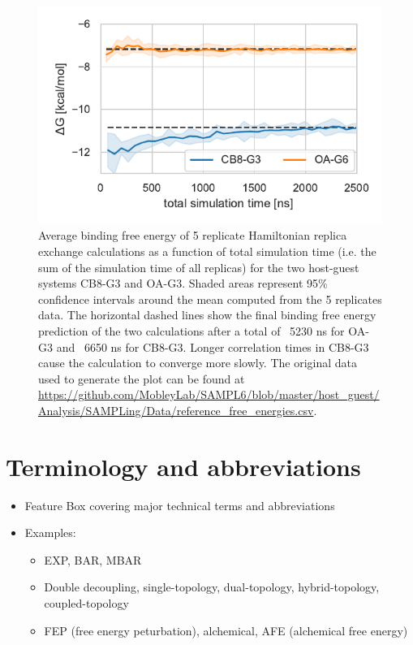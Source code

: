 \documentclass[9pt,bestpractices]{livecoms}
\begin{document}
\begin{figure}
    \includegraphics[width=0.95\linewidth]{paper/figures/fig8_convergence/free_energy_trajectories.pdf}
    \caption{Average binding free energy of 5 replicate Hamiltonian replica exchange calculations as a function of total simulation time (i.e. the sum of the simulation time of all replicas) for the two host-guest systems CB8-G3 and OA-G3. Shaded areas represent 95\% confidence intervals around the mean computed from the 5 replicates data. The horizontal dashed lines show the final binding free energy prediction of the two calculations after a total of ~5230 ns for OA-G3 and ~6650 ns for CB8-G3. Longer correlation times in CB8-G3 cause the calculation to converge more slowly. The original data used to generate the plot can be found at \url{https://github.com/MobleyLab/SAMPL6/blob/master/host_guest/Analysis/SAMPLing/Data/reference_free_energies.csv}.
}
    \label{fig:freeenergytrajectories}
\end{figure}

\section{Terminology and abbreviations}
\label{sec:tem-abbrev}
\begin{itemize}
\item Feature Box covering major technical terms and abbreviations
\item Examples:
\begin{itemize}
\item EXP, BAR, MBAR
\item Double decoupling, single-topology, dual-topology, hybrid-topology, coupled-topology
\item FEP (free energy peturbation), alchemical, AFE (alchemical free energy)
\end{itemize}
\end{itemize}
\end{document}

